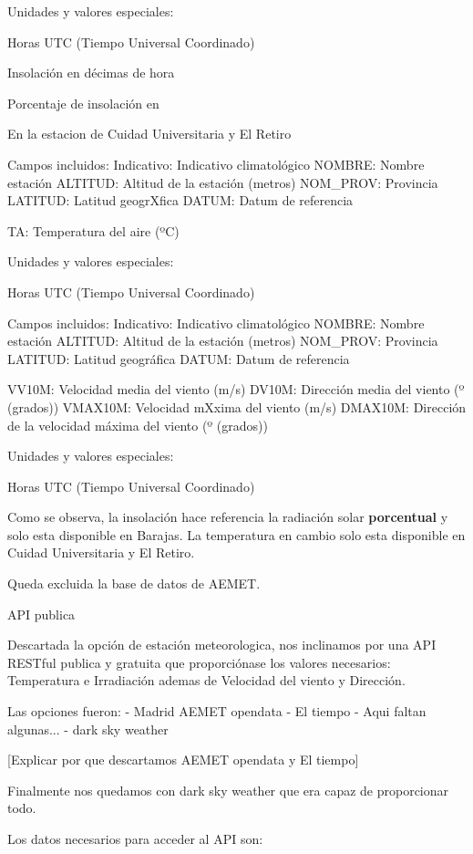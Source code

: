 Unidades y valores especiales:

Horas UTC (Tiempo Universal Coordinado)

Insolación en décimas de hora

Porcentaje de insolación en


En la estacion de Cuidad Universitaria y El Retiro

Campos incluidos:
Indicativo: Indicativo climatológico
NOMBRE: Nombre estación
ALTITUD: Altitud de la estación (metros)
NOM\_PROV: Provincia
LATITUD: Latitud geogrXfica
DATUM: Datum de referencia

TA: Temperatura del aire (ºC)

Unidades y valores especiales:

Horas UTC (Tiempo Universal Coordinado)

Campos incluidos:
Indicativo: Indicativo climatológico
NOMBRE: Nombre estación
ALTITUD: Altitud de la estación (metros)
NOM\_PROV: Provincia
LATITUD: Latitud geográfica
DATUM: Datum de referencia

VV10M: Velocidad media del viento (m/s)
DV10M: Dirección media del viento (º (grados))
VMAX10M: Velocidad mXxima del viento (m/s)
DMAX10M: Dirección de la velocidad máxima del viento (º (grados))



Unidades y valores especiales:

Horas UTC (Tiempo Universal Coordinado)


Como se observa, la insolación hace referencia la radiación solar \textbf{porcentual} y solo esta disponible en Barajas.
La temperatura en cambio solo esta disponible en Cuidad Universitaria y El Retiro.

Queda excluida la base de datos de AEMET.

API publica

Descartada la opción de estación meteorologica, nos inclinamos por una API RESTful publica y gratuita que proporciónase los valores necesarios: Temperatura e Irradiación ademas de Velocidad del viento y Dirección.

Las opciones fueron:
- Madrid AEMET opendata
- El tiempo
- Aqui faltan algunas...
- dark sky weather

[Explicar por que descartamos AEMET opendata y El tiempo]

Finalmente nos quedamos con dark sky weather que era capaz de proporcionar todo.

Los datos necesarios para acceder al API son:

